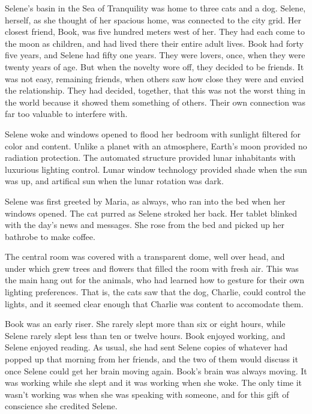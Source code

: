 

﻿Selene's basin in the Sea of Tranquility was home to three cats and a
dog.  Selene, herself, as she thought of her spacious home, was
connected to the city grid.  Her closest friend, Book, was five
hundred meters west of her.  They had each come to the moon as
children, and had lived there their entire adult lives.  Book had
forty five years, and Selene had fifty one years.  They were lovers,
once, when they were twenty years of age.  But when the novelty wore
off, they decided to be friends.  It was not easy, remaining friends,
when others saw how close they were and envied the relationship.  They
had decided, together, that this was not the worst thing in the world
because it showed them something of others.  Their own connection was
far too valuable to interfere with.

Selene woke and windows opened to flood her bedroom with sunlight
filtered for color and content.  Unlike a planet with an atmosphere,
Earth's moon provided no radiation protection.  The automated
structure provided lunar inhabitants with luxurious lighting control.
Lunar window technology provided shade when the sun was up, and
artifical sun when the lunar rotation was dark.

Selene was first greeted by Maria, as always, who ran into the bed
when her windows opened.  The cat purred as Selene stroked her back.
Her tablet blinked with the day's news and messages.  She rose from
the bed and picked up her bathrobe to make coffee.

The central room was covered with a transparent dome, well over head,
and under which grew trees and flowers that filled the room with fresh
air.  This was the main hang out for the animals, who had learned how
to gesture for their own lighting preferences.  That is, the cats saw
that the dog, Charlie, could control the lights, and it seemed clear
enough that Charlie was content to accomodate them.

Book was an early riser.  She rarely slept more than six or eight
hours, while Selene rarely slept less than ten or twelve hours.  Book
enjoyed working, and Selene enjoyed reading.  As usual, she had sent
Selene copies of whatever had popped up that morning from her friends,
and the two of them would discuss it once Selene could get her brain
moving again.  Book's brain was always moving.  It was working while
she slept and it was working when she woke.  The only time it wasn't
working was when she was speaking with someone, and for this gift of
conscience she credited Selene.

